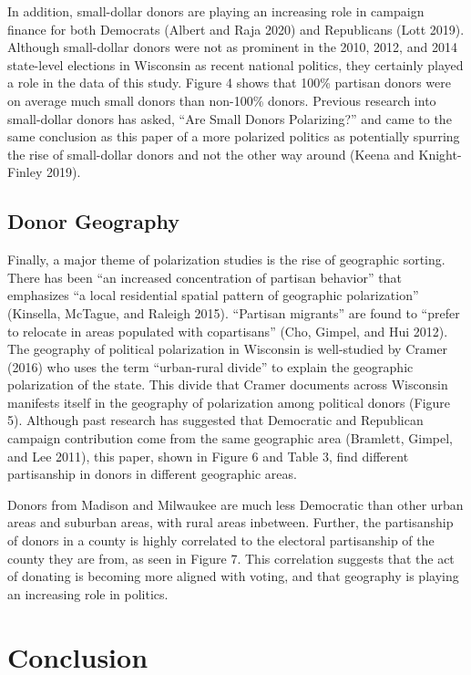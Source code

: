 \documentclass[12pt,]{article}
\begin{document}
In addition, small-dollar donors are playing an increasing role in
campaign finance for both Democrats (Albert and Raja 2020) and
Republicans (Lott 2019). Although small-dollar donors were not as
prominent in the 2010, 2012, and 2014 state-level elections in Wisconsin
as recent national politics, they certainly played a role in the data of
this study. Figure 4 shows that 100\% partisan donors were on average
much small donors than non-100\% donors. Previous research into
small-dollar donors has asked, ``Are Small Donors Polarizing?'' and came
to the same conclusion as this paper of a more polarized politics as
potentially spurring the rise of small-dollar donors and not the other
way around (Keena and Knight-Finley 2019).

\hypertarget{donor-geography}{%
\subsection{Donor Geography}\label{donor-geography}}

Finally, a major theme of polarization studies is the rise of geographic
sorting. There has been ``an increased concentration of partisan
behavior'' that emphasizes ``a local residential spatial pattern of
geographic polarization'' (Kinsella, McTague, and Raleigh 2015).
``Partisan migrants'' are found to ``prefer to relocate in areas
populated with copartisans'' (Cho, Gimpel, and Hui 2012). The geography
of political polarization in Wisconsin is well-studied by Cramer (2016)
who uses the term ``urban-rural divide'' to explain the geographic
polarization of the state. This divide that Cramer documents across
Wisconsin manifests itself in the geography of polarization among
political donors (Figure 5). Although past research has suggested that
Democratic and Republican campaign contribution come from the same
geographic area (Bramlett, Gimpel, and Lee 2011), this paper, shown in
Figure 6 and Table 3, find different partisanship in donors in different
geographic areas.

Donors from Madison and Milwaukee are much less Democratic than other
urban areas and suburban areas, with rural areas inbetween. Further, the
partisanship of donors in a county is highly correlated to the electoral
partisanship of the county they are from, as seen in Figure 7. This
correlation suggests that the act of donating is becoming more aligned
with voting, and that geography is playing an increasing role in
politics.

\hypertarget{conclusion}{%
\section{Conclusion}\label{conclusion}}
\end{document}
